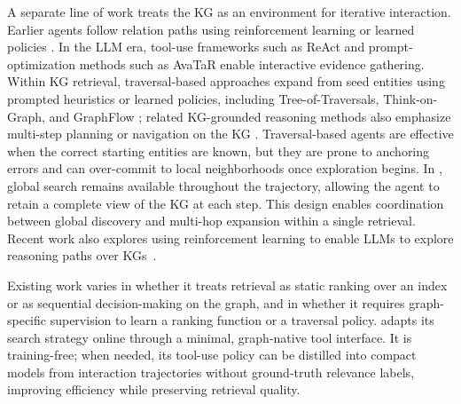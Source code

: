 A separate line of work treats the KG as an environment for iterative interaction. Earlier agents follow relation paths using reinforcement learning or learned policies \cite{das_go_2018, xiong_deeppath_2017, sun_pullnet_2019, asai_learning_2020}. In the LLM era, tool-use frameworks such as ReAct \cite{yao_react_2023} and prompt-optimization methods such as AvaTaR \cite{wu_avatar_2024} enable interactive evidence gathering.
Within KG retrieval, traversal-based approaches expand from seed entities using prompted heuristics or learned policies, including Tree-of-Traversals, Think-on-Graph, and GraphFlow \cite{markowitz_tree--traversals_2024,sun_think--graph_2024,yu_can_2025, ma2025think}; related KG-grounded reasoning methods also emphasize multi-step planning or navigation on the KG \cite{luo_reasoning_2024,sun_search--graph_2025}. Traversal-based agents are effective when the correct starting entities are known, but they are prone to anchoring errors and can over-commit to local neighborhoods once exploration begins. In \retrieverShort, global search remains available throughout the trajectory, allowing the agent to retain a complete view of the KG at each step. This design enables coordination between global discovery and multi-hop expansion within a single retrieval. Recent work also explores using reinforcement learning to enable LLMs to explore reasoning paths over KGs~\cite{yan2026explore,wang2026kg}.

Existing work varies in whether it treats retrieval as static ranking over an index or as sequential decision-making on the graph, and in whether it requires graph-specific supervision to learn a ranking function or a traversal policy. \retrieverShort adapts its search strategy online through a minimal, graph-native tool interface. It is training-free; when needed, its tool-use policy can be distilled into compact models from interaction trajectories without ground-truth relevance labels, improving efficiency while preserving retrieval quality.
